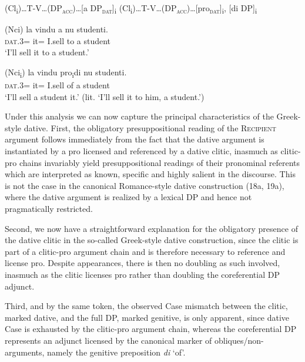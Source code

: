 \documentclass[output=paper,modfonts,nonflat,colorlinks,citecolor=brown]{langsci/langscibook}
\begin{document}
\ea\label{ex:ledgeway:18}
\ea  (Cl\textsubscript{i})…T-V…(DP\textsc{\textsubscript{acc}}\textsc{)}…[a  DP\textsc{\textsubscript{dat}}]\textsubscript{i}
\ex *(Cl\textsubscript{i})…T-V…(DP\textsc{\textsubscript{acc}}\textsc{)}…[pro\textsc{\textsubscript{dat}}]\textsubscript{i}, [di DP]\textsubscript{i}
\z
\z

\ea\label{ex:ledgeway:19}
\ea
	\gll (Nci)  la  vindu  a  nu  studenti.\\
    \textsc{dat}.3=  it=  I.sell  to  a  student\\
    \glt `I’ll sell it to a student.'

\ex  *(Nci\textsubscript{i})  la  vindu  pro\textsubscript{i}di  nu  studenti.\\
      \textsc{dat}.3=  it=  I.sell    of  a  student\\
    \glt `I’ll sell a student it.' (lit. `I’ll sell it to him, a student.')
    \z
    \z

Under this analysis we can now capture the principal characteristics of the Greek-style dative. First, the obligatory presuppositional reading of the \textsc{Recipient} argument follows immediately from the fact that the dative argument is instantiated by a pro licensed and referenced by a dative clitic, inasmuch as clitic-pro chains invariably yield presuppositional readings of their pronominal referents which are interpreted as known, specific and highly salient in the discourse. This is not the case in the canonical Romance-style dative construction (18a, 19a), where the dative argument is realized by a lexical DP and hence not pragmatically restricted.

Second, we now have a straightforward explanation for the obligatory presence of the dative clitic in the so-called Greek-style dative construction, since the clitic is part of a clitic-pro argument chain and is therefore necessary to reference and license pro. Despite appearances, there is then no doubling as such involved, inasmuch as the clitic licenses pro rather than doubling the coreferential DP adjunct. 

Third, and by the same token, the observed Case mismatch between the clitic, marked dative, and the full DP, marked genitive, is only apparent, since dative Case is exhausted by the clitic-pro argument chain, whereas the coreferential DP represents an adjunct licensed by the canonical marker of obliques/non-arguments, namely the genitive preposition \textit{di} ‘of’. 
\end{document}
